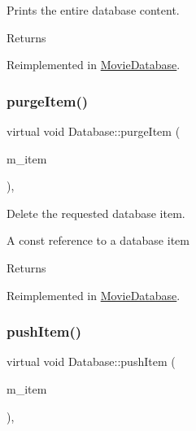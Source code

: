 Prints the entire database content. 

\begin{DoxyReturn}{Returns}

\end{DoxyReturn}


Reimplemented in \hyperlink{classMovieDatabase_af1e13b6fc0fd7186e98edbe2cf187618}{Movie\+Database}.

\mbox{\label{classDatabase_a5d232b9f62079682dd7fe7983b252e5e}} 
\subsubsection{\texorpdfstring{purge\+Item()}{purgeItem()}}
{\footnotesize\ttfamily virtual void Database\+::purge\+Item (\begin{DoxyParamCaption}\item[{const \hyperlink{classDatabaseItem}{Database\+Item} \&}]{m\+\_\+item }\end{DoxyParamCaption})\hspace{0.3cm}{\ttfamily [inline]}, {\ttfamily [virtual]}}



Delete the requested database item. 

A const reference to a database item

\begin{DoxyReturn}{Returns}

\end{DoxyReturn}


Reimplemented in \hyperlink{classMovieDatabase_a85faa4c33b3ab2dc0d1f4939bb034797}{Movie\+Database}.

\mbox{\label{classDatabase_a80fa14ab9f4deadc9a2ab7493f1919a4}} 
\subsubsection{\texorpdfstring{push\+Item()}{pushItem()}}
{\footnotesize\ttfamily virtual void Database\+::push\+Item (\begin{DoxyParamCaption}\item[{const \hyperlink{classDatabaseItem}{Database\+Item} \&}]{m\+\_\+item }\end{DoxyParamCaption})\hspace{0.3cm}{\ttfamily [inline]}, {\ttfamily [virtual]}}



